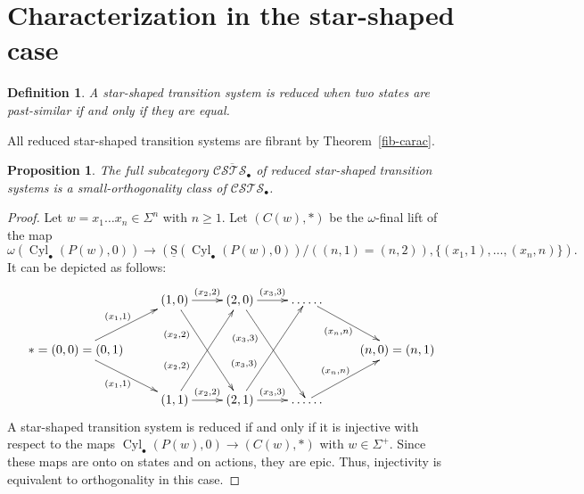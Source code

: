 \documentclass[a4paper,12pt]{amsart}
\newtheorem{prop}[thm]{Proposition}
\newtheorem{defn}[thm]{Definition}
\begin{document}
\section{Characterization in the star-shaped case}
\label{desc-bullet}

\begin{defn} A star-shaped transition system is {\rm reduced} when two states are
past-similar if and only if they are equal. \end{defn}

All reduced star-shaped transition systems are fibrant by
Theorem~\ref{fib-carac}.

\begin{prop} The full subcategory $\overline{{\mathcal{C\!S\!T\!S}}_\bullet}$ of reduced
star-shaped transition systems is a small-orthogonality class of
${\mathcal{C\!S\!T\!S}}_\bullet$. \end{prop}

\begin{proof} Let $w=x_1\dots x_n \in \Sigma^n$ with $n{\geqslant} 1$. Let $(C(w),*)$
be the $\omega$-final lift of the map \[\omega(\operatorname{{Cyl}}_\bullet(P(w),0))
\to (\operatorname{\underline{S}}(\operatorname{{Cyl}}_\bullet(P(w),0))/((n,1)=(n,2)),\{(x_1,1),\dots,(x_n,n)\}).\]
It can be depicted as follows: 
\[
\xymatrix
{
& (1,0) {\ar@{->}[r]^-{{(x_2,2)}}}\ar@{->}[rdd]_-/-20pt/{(x_2,2)} & (2,0) {\ar@{->}[r]^-{{(x_3,3)}}} \ar@{->}[rdd]_-/-20pt/{(x_3,3)}&\dots\dots   \ar@{->}[rd]_-{(x_n,n)} &\\
{*=(0,0)=(0,1)} \ar@{->}[ru]^-{(x_1,1)} \ar@{->}[rd]_-{(x_1,1)} &&&& (n,0) = (n,1)\\
& (1,1) {\ar@{->}[r]^-{{(x_2,2)}}}\ar@{->}[ruu]^-/-20pt/{(x_2,2)} & (2,1) {\ar@{->}[r]^-{{(x_3,3)}}}\ar@{->}[ruu]^-/-20pt/{(x_3,3)} &\dots\dots   \ar@{->}[ru]^-{(x_n,n)} & \\
}
\]
A star-shaped transition system is reduced if and only if it is
injective with respect to the maps $\operatorname{{Cyl}}_\bullet(P(w),0) \to (C(w),*)$
with $w\in \Sigma^+$. Since these maps are onto on states and on
actions, they are epic.  Thus, injectivity is equivalent to
orthogonality in this case.  \end{proof}
\end{document}
